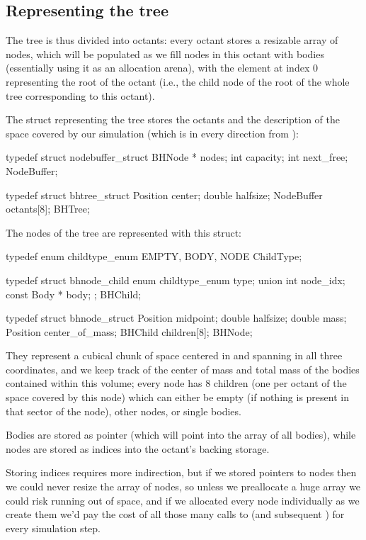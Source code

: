 \documentclass[a4paper, 11pt]{article}
\begin{document}
\subsection{Representing the tree}

The tree is thus divided into octants:
every octant stores a resizable array of nodes, which will be populated as we
fill nodes in this octant with bodies (essentially using it as an allocation arena),
with the element at index 0 representing the root of the octant
(i.e., the child node of the root of the whole tree corresponding to this octant).

The struct representing the tree stores the octants
and the description of the space covered by our simulation
(which is \pm{} in every direction from ):

\begin{ccode}
typedef struct nodebuffer_struct {
	BHNode * nodes;
	int capacity;
	int next_free;
} NodeBuffer;

typedef struct bhtree_struct {
	Position center;
	double halfsize;
	NodeBuffer octants[8];
} BHTree;
\end{ccode}

The nodes of the tree are represented with this struct:

\begin{ccode}
typedef enum childtype_enum {EMPTY, BODY, NODE} ChildType;

typedef struct bhnode_child {
	enum childtype_enum type;
	union {
		int node_idx;
		const Body * body;
	};
} BHChild;

typedef struct bhnode_struct {
	Position midpoint;
	double halfsize;
	double mass;
	Position center_of_mass;
	BHChild children[8];
} BHNode;
\end{ccode}

They represent a cubical chunk of space centered in 
and spanning \pm{} in all three coordinates,
and we keep track of the center of mass and total mass of the bodies
contained within this volume; every node has 8 children
(one per octant of the space covered by this node)
which can either be empty
(if nothing is present in that sector of the node), other nodes, or single bodies.

Bodies are stored as pointer (which will point into the array of all bodies),
while nodes are stored as indices into the octant's backing storage.

Storing indices requires more indirection,
but if we stored pointers to nodes then we could never
resize the array of nodes, so unless we preallocate a huge array we could risk
running out of space,
and if we allocated every node individually as we create them
we'd pay the cost of all those many calls to  (and subsequent )
for every simulation step.
\end{document}
